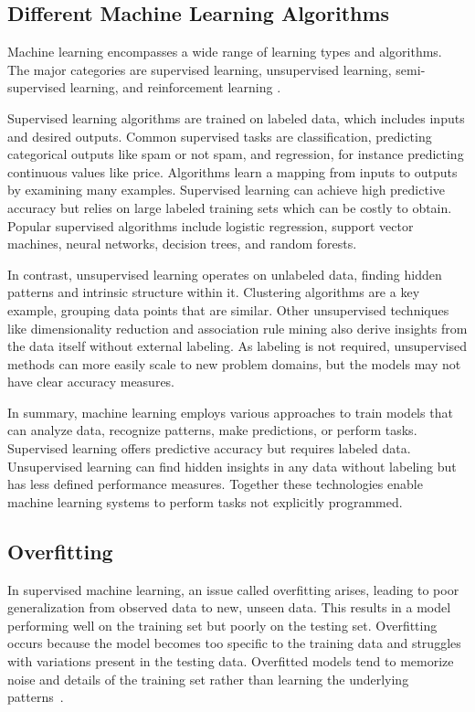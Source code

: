 \subsection{Different Machine Learning Algorithms}
Machine learning encompasses a wide range of learning types and algorithms. The major categories are supervised learning, unsupervised learning, semi-supervised learning, and reinforcement learning \cite{Alpaydin14}.

Supervised learning algorithms are trained on labeled data, which includes inputs and desired outputs. Common supervised tasks are classification, predicting categorical outputs like spam or not spam,
and regression, for instance predicting continuous values like price. Algorithms learn a mapping from inputs
to outputs by examining many examples. Supervised learning can achieve high 
predictive accuracy but relies on large labeled training sets which can be costly to obtain. 
Popular supervised algorithms include logistic regression, support vector machines, neural networks, decision trees, and random forests.

In contrast, unsupervised learning operates on unlabeled data, finding hidden patterns and intrinsic structure within it. Clustering algorithms are a key example, grouping data points that are similar. Other unsupervised techniques like dimensionality reduction and association rule mining also derive insights from the data itself without external labeling. As labeling is not required, unsupervised methods can more easily scale to new problem domains, but the models may not have clear accuracy measures.

In summary, machine learning employs various approaches to train models that can analyze data, recognize patterns, make predictions, or perform tasks. Supervised learning offers predictive accuracy but requires labeled data. Unsupervised learning can find hidden insights in any data without labeling but has less defined performance measures. Together these technologies enable machine learning systems to perform tasks not explicitly programmed.



\subsection{Overfitting}
\label{sec:overfit}


In supervised machine learning, an issue called overfitting arises, leading to poor generalization from observed data to new, unseen data. This results in a model performing well on the training set but poorly on the testing set. Overfitting occurs because the model becomes too specific to the training data and struggles with variations present in the testing data. Overfitted models tend to memorize noise and details of the training set rather than learning the underlying patterns~\cite{Ying_2019}.


